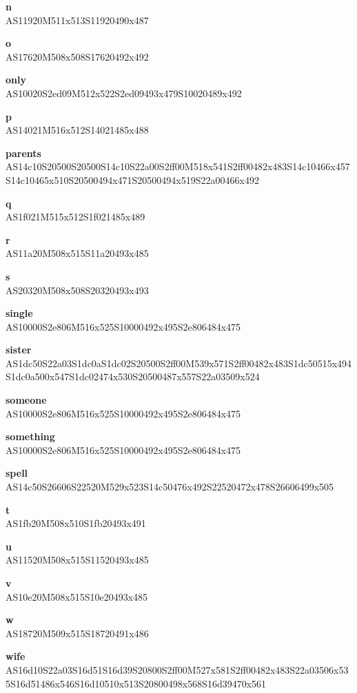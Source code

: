 \documentclass{article}
\begin{document}
\begin{glossary}
\textbf{n}\\
AS11920M511x513S11920490x487

\textbf{o}\\
AS17620M508x508S17620492x492

\textbf{only}\\
AS10020S2ed09M512x522S2ed09493x479S10020489x492

\textbf{p}\\
AS14021M516x512S14021485x488

\textbf{parents}\\
AS14c10S20500S20500S14c10S22a00S2ff00M518x541S2ff00482x483S14c10466x457S14c10465x510S20500494x471S20500494x519S22a00466x492

\textbf{q}\\
AS1f021M515x512S1f021485x489

\textbf{r}\\
AS11a20M508x515S11a20493x485

\textbf{s}\\
AS20320M508x508S20320493x493

\textbf{single}\\
AS10000S2e806M516x525S10000492x495S2e806484x475

\textbf{sister}\\
AS1dc50S22a03S1dc0aS1dc02S20500S2ff00M539x571S2ff00482x483S1dc50515x494S1dc0a500x547S1dc02474x530S20500487x557S22a03509x524

\textbf{someone}\\
AS10000S2e806M516x525S10000492x495S2e806484x475

\textbf{something}\\
AS10000S2e806M516x525S10000492x495S2e806484x475

\textbf{spell}\\
AS14c50S26606S22520M529x523S14c50476x492S22520472x478S26606499x505

\textbf{t}\\
AS1fb20M508x510S1fb20493x491

\textbf{u}\\
AS11520M508x515S11520493x485

\textbf{v}\\
AS10e20M508x515S10e20493x485

\textbf{w}\\
AS18720M509x515S18720491x486

\textbf{wife}\\
AS16d10S22a03S16d51S16d39S20800S2ff00M527x581S2ff00482x483S22a03506x535S16d51486x546S16d10510x513S20800498x568S16d39470x561


\end{glossary}
\end{document}
